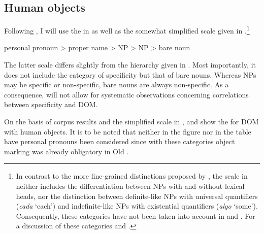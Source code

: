 \documentclass[output=paper]{LSP/langsci}
\begin{document}
\subsection{Human objects}\label{08-ga-sec:3.2}

Following \citet[436--438]{Laca2006Objeto}, I will use the  in  as well as the somewhat simplified  scale given in .\footnote{In contrast to the more fine-grained distinctions proposed by \citet[439--443]{Laca2006Objeto}, the scale in  neither includes the differentiation between NPs with and without lexical heads, nor the distinction between definite-like NPs with universal quantifiers (\eg \textit{cada} ‘each’) and indefinite-like NPs with existential quantifiers (\eg \textit{algo} ‘some’). Consequently, these categories have not been taken into account in  and . For a discussion of these categories \cf \citet[437--439]{Laca2006Objeto} and \citet[82--87]{GarciaGarcia2014Objektmarkierung}.} 

\ea \label{08-ga-ex:6}
personal pronoun > proper name >  NP >  NP > bare noun
\z

The latter scale differs slightly from the hierarchy given in . Most importantly, it does not include the category of specificity but that of bare nouns. Whereas  NPs may be specific or non-specific, bare nouns are always non-specific. As a consequence,  will not allow for systematic observations concerning correlations between specificity and DOM.

On the basis of  corpus results and the simplified  scale in ,  and  show the  for DOM with human objects. It is to be noted that neither in the figure nor in the table have personal pronouns been considered since with these categories object marking was already obligatory in Old .
\end{document}
